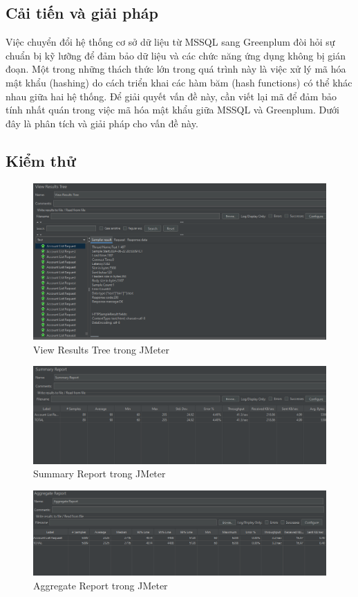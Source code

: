 \documentclass{article}[14pt]
\begin{document}
\subsection{Cải tiến và giải pháp}

Việc chuyển đổi hệ thống cơ sở dữ liệu từ MSSQL sang Greenplum đòi hỏi sự chuẩn bị kỹ lưỡng để đảm bảo dữ liệu và các chức năng ứng dụng không bị gián đoạn. Một trong những thách thức lớn trong quá trình này là việc xử lý mã hóa mật khẩu (hashing) do cách triển khai các hàm băm (hash functions) có thể khác nhau giữa hai hệ thống. Để giải quyết vấn đề này, cần viết lại mã để đảm bảo tính nhất quán trong việc mã hóa mật khẩu giữa MSSQL và Greenplum. Dưới đây là phân tích và giải pháp cho vấn đề này.

\subsection{Kiểm thử}


\begin{figure}
    \centering
    \includegraphics[width=0.8\linewidth]{images/vrt.png}
    \caption{View Results Tree trong JMeter}
    \label{fig:vrt}
\end{figure}

\begin{figure}
    \centering
    \includegraphics[width=0.8\linewidth]{images/sr.png}
     \caption{Summary Report trong JMeter}
    \label{fig:sr}
\end{figure}

\begin{figure}
    \centering
    \includegraphics[width=0.8\linewidth]{images/ar.png}
    \caption{Aggregate Report trong JMeter}
    \label{fig:ar}
\end{figure}
\end{document}

